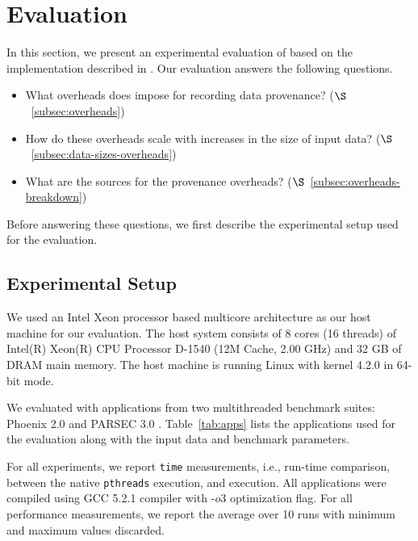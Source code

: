 \section{Evaluation}
\label{sec:evaluation}

In this section, we present an experimental evaluation of \projecttitle based on the implementation described in  . Our evaluation answers the following questions.

\begin{itemize}
\item What overheads does \projecttitle impose for recording data provenance? ($\S$~\ref{subsec:overheads})
\item How do these overheads scale with increases in the size of input data? ($\S$~\ref{subsec:data-sizes-overheads})
\item What are the sources for the provenance overheads? ($\S$~\ref{subsec:overheads-breakdown})
\end{itemize}

Before answering these questions, we first describe the experimental setup used for the evaluation.

\subsection{Experimental Setup}


 We used an Intel Xeon processor based
multicore architecture as our host machine for our evaluation. The
host system consists of 8 cores (16 threads) of Intel(R) Xeon(R) CPU Processor D-1540
(12M Cache, 2.00 GHz) and 32 GB of DRAM main memory. The host
machine is running Linux with kernel 4.2.0 in 64-bit mode.


  We evaluated \projecttitle with applications from two multithreaded benchmark suites: Phoenix 2.0 \cite{phoenix} and PARSEC 3.0 \cite{parsec}. Table~\ref{tab:apps} lists the applications used for the evaluation along with the input data and benchmark parameters.


  For all experiments,  we report {\tt time} measurements, i.e., run-time comparison, between the native {\tt pthreads} execution, and \projecttitle execution.  All applications were compiled using GCC 5.2.1 compiler with -$o3$ optimization flag. For all performance measurements, we report the average over 10 runs with minimum and maximum values discarded.

